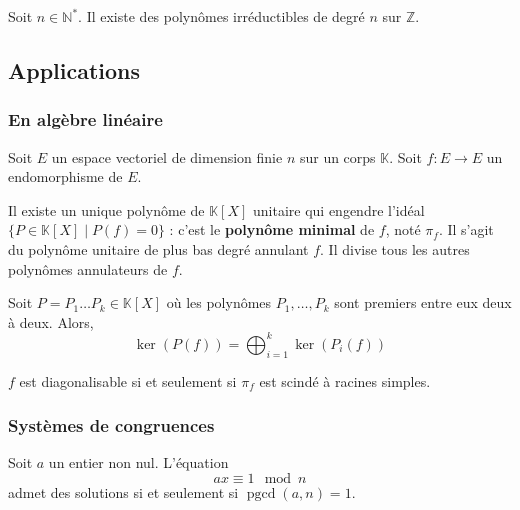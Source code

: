 
	\begin{application}
		Soit $n \in \mathbb{N}^*$. Il existe des polynômes irréductibles de degré $n$ sur $\mathbb{Z}$.
	\end{application}

	\subsection{Applications}

	\subsubsection{En algèbre linéaire}

	Soit $E$ un espace vectoriel de dimension finie $n$ sur un corps $\mathbb{K}$. Soit $f : E \rightarrow E$ un endomorphisme de $E$.


	\begin{proposition}
		Il existe un unique polynôme de $\mathbb{K}[X]$ unitaire qui engendre l'idéal $\{ P \in \mathbb{K}[X] \mid P(f) = 0 \}$ : c'est le \textbf{polynôme minimal} de $f$, noté $\pi_f$. Il s'agit du polynôme unitaire de plus bas degré annulant $f$. Il divise tous les autres polynômes annulateurs de $f$.
	\end{proposition}


	\begin{theorem}
		Soit $P = P_1 \dots P_k \in \mathbb{K}[X]$ où les polynômes $P_1, \dots, P_k$ sont premiers entre eux deux à deux. Alors,
		\[ \ker(P(f)) = \bigoplus_{i=1}^k \ker(P_i(f)) \]
	\end{theorem}

	\begin{application}
		$f$ est diagonalisable si et seulement si $\pi_f$ est scindé à racines simples.
	\end{application}

	\newpage
	\subsubsection{Systèmes de congruences}


	\begin{proposition}
		Soit $a$ un entier non nul. L'équation
		\[ ax \equiv 1 \mod n \]
		admet des solutions si et seulement si $\operatorname{pgcd}(a,n) = 1$.
	\end{proposition}

